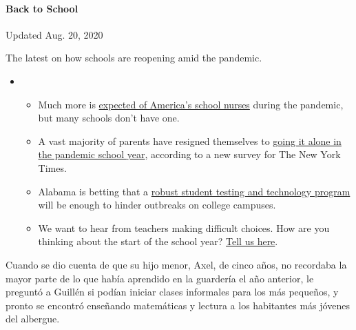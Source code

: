 \hypertarget{back-to-school}{%
\paragraph{Back to School}\label{back-to-school}}

Updated Aug. 20, 2020

The latest on how schools are reopening amid the pandemic.

\begin{itemize}
\item
  \begin{itemize}
  \tightlist
  \item
    Much more is
    \href{https://www.nytimes3xbfgragh.onion/2020/08/20/us/schools-reopening-nurses-covid.html?action=click\&pgtype=Article\&state=default\&region=MAIN_CONTENT_3\&context=storylines_keepup}{expected
    of America's school nurses} during the pandemic, but many schools
    don't have one.
  \item
    A vast majority of parents have resigned themselves to
    \href{https://www.nytimes3xbfgragh.onion/2020/08/19/us/colleges-closing-covid.html?action=click\&pgtype=Article\&state=default\&region=MAIN_CONTENT_3\&context=storylines_keepup}{going
    it alone in the pandemic school year}, according to a new survey for
    The New York Times.
  \item
    Alabama is betting that a
    \href{https://www.nytimes3xbfgragh.onion/2020/08/19/business/alabama-uab-coronavirus-tests.html?action=click\&pgtype=Article\&state=default\&region=MAIN_CONTENT_3\&context=storylines_keepup}{robust
    student testing and technology program} will be enough to hinder
    outbreaks on college campuses.
  \item
    We want to hear from teachers making difficult choices. How are you
    thinking about the start of the school year?
    \href{https://www.nytimes3xbfgragh.onion/2020/08/19/us/teachers-school-reopenings.html?action=click\&pgtype=Article\&state=default\&region=MAIN_CONTENT_3\&context=storylines_keepup}{Tell
    us here}.
  \end{itemize}
\end{itemize}

Cuando se dio cuenta de que su hijo menor, Axel, de cinco años, no
recordaba la mayor parte de lo que había aprendido en la guardería el
año anterior, le preguntó a Guillén si podían iniciar clases informales
para los más pequeños, y pronto se encontró enseñando matemáticas y
lectura a los habitantes más jóvenes del albergue.

